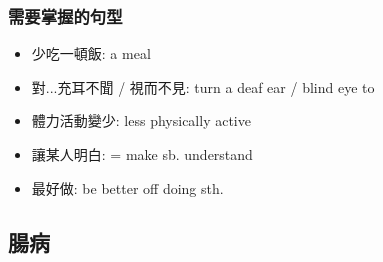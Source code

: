 \subsubsection*{需要掌握的句型}
\begin{itemize}
  \itemsep0em
  \item 少吃一頓飯:  a meal
  \item 對...充耳不聞 / 視而不見: turn a deaf ear / blind eye to
  \item 體力活動變少: less physically active
  \item 讓某人明白:  = make sb. understand
  \item 最好做: be better off doing sth.
\end{itemize}

\subsection{腸病}
